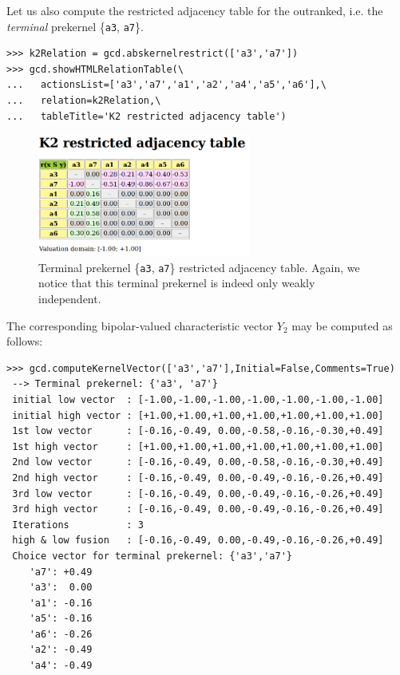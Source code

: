 Let us also compute the restricted adjacency table for the outranked, i.e. the \emph{terminal} prekernel \{\texttt{a3}, \texttt{a7}\}.
\begin{lstlisting}
>>> k2Relation = gcd.abskernelrestrict(['a3','a7'])
>>> gcd.showHTMLRelationTable(\
...   actionsList=['a3','a7','a1','a2','a4','a5','a6'],\
...   relation=k2Relation,\
...   tableTitle='K2 restricted adjacency table')
\end{lstlisting}
\begin{figure}[ht]
\sidecaption[t]
\includegraphics[width=7cm]{Figures/17-11-k2restricted.png}
\caption{Terminal prekernel \{\texttt{a3}, \texttt{a7}\} restricted adjacency table. Again, we notice that this terminal prekernel is indeed only weakly independent.}
\label{fig:17.11}       %
\end{figure}

The corresponding bipolar-valued characteristic vector $Y_2$ may be computed as follows:
\begin{lstlisting}
>>> gcd.computeKernelVector(['a3','a7'],Initial=False,Comments=True)
 --> Terminal prekernel: {'a3', 'a7'}
 initial low vector  : [-1.00,-1.00,-1.00,-1.00,-1.00,-1.00,-1.00]
 initial high vector : [+1.00,+1.00,+1.00,+1.00,+1.00,+1.00,+1.00]
 1st low vector      : [-0.16,-0.49, 0.00,-0.58,-0.16,-0.30,+0.49]
 1st high vector     : [+1.00,+1.00,+1.00,+1.00,+1.00,+1.00,+1.00]
 2nd low vector      : [-0.16,-0.49, 0.00,-0.58,-0.16,-0.30,+0.49]
 2nd high vector     : [-0.16,-0.49, 0.00,-0.49,-0.16,-0.26,+0.49]
 3rd low vector      : [-0.16,-0.49, 0.00,-0.49,-0.16,-0.26,+0.49]
 3rd high vector     : [-0.16,-0.49, 0.00,-0.49,-0.16,-0.26,+0.49]
 Iterations          : 3
 high & low fusion   : [-0.16,-0.49, 0.00,-0.49,-0.16,-0.26,+0.49]
 Choice vector for terminal prekernel: {'a3','a7'}
    'a7': +0.49
    'a3':  0.00
    'a1': -0.16
    'a5': -0.16
    'a6': -0.26
    'a2': -0.49
    'a4': -0.49
\end{lstlisting}

